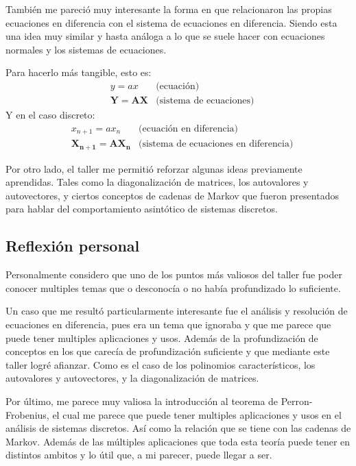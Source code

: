 \documentclass[11pt]{article}
\begin{document}
    También me pareció muy interesante la forma en que relacionaron las propias ecuaciones en diferencia con el sistema de ecuaciones en diferencia. Siendo esta una idea muy similar y hasta análoga a lo que se suele hacer con ecuaciones normales y los sistemas de ecuaciones.

    Para hacerlo más tangible, esto es:
    \begin{align*}
        &y = a x &\text{(ecuación)}\\
        &\mathbf{Y} = \mathbf{A} \mathbf{X} &\text{(sistema de ecuaciones)}
    \end{align*}
    Y en el caso discreto:
    \begin{align*}
        &x_{n+1} = a x_n &\text{(ecuación en diferencia)}\\
        &\mathbf{X_{n+1}} = \mathbf{A} \mathbf{X_n} &\text{(sistema de ecuaciones en diferencia)}
    \end{align*}

    Por otro lado, el taller me permitió reforzar algunas ideas previamente aprendidas. Tales como la diagonalización de matrices, los autovalores y autovectores, y ciertos conceptos de cadenas de Markov que fueron presentados para hablar del comportamiento asintótico de sistemas discretos.

    \subsection{Reflexión personal}
    Personalmente considero que uno de los puntos más valiosos del taller fue poder conocer multiples temas que o desconocía o no había profundizado lo suficiente.

    Un caso que me resultó particularmente interesante fue el análisis y resolución de ecuaciones en diferencia, pues era un tema que ignoraba y que me parece que puede tener multiples aplicaciones y usos. Además de la profundización de conceptos en los que carecía de profundización suficiente y que mediante este taller logré afianzar. Como es el caso de los polinomios característicos, los autovalores y autovectores, y la diagonalización de matrices.

    Por último, me parece muy valiosa la introducción al teorema de Perron-Frobenius, el cual me parece que puede tener multiples aplicaciones y usos en el análisis de sistemas discretos. Así como la relación que se tiene con las cadenas de Markov. Además de las múltiples aplicaciones que toda esta teoría puede tener en distintos ambitos y lo útil que, a mi parecer, puede llegar a ser.
\end{document}
